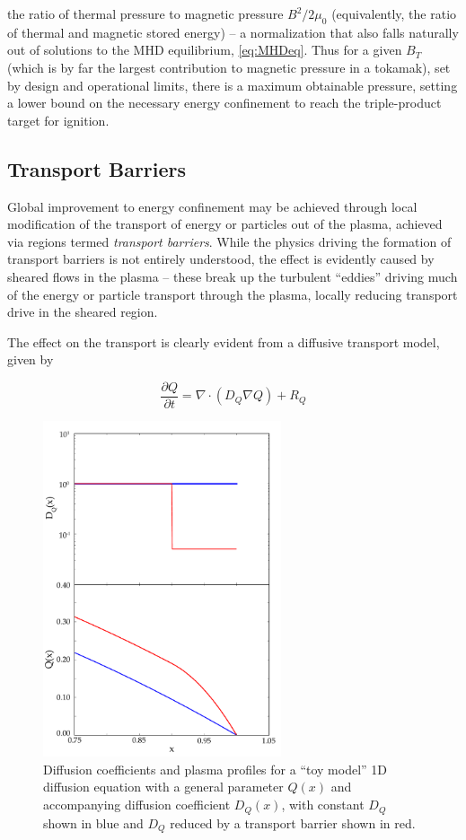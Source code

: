 \noindent the ratio of thermal pressure to magnetic pressure $B^2/2\mu_0$ (equivalently, the ratio of thermal and magnetic stored energy) -- a normalization that also falls naturally out of solutions to the MHD equilibrium, \cref{eq:MHDeq}.  Thus for a given $B_T$ (which is by far the largest contribution to magnetic pressure in a tokamak), set by design and operational limits, there is a maximum obtainable pressure, setting a lower bound on the necessary energy confinement to reach the triple-product target for ignition.

\subsection{Transport Barriers}\label{subsec:intro_barriers}

Global improvement to energy confinement may be achieved through local modification of the transport of energy or particles out of the plasma, achieved via regions termed \emph{transport barriers}.  While the physics driving the formation of transport barriers is not entirely understood, the effect is evidently caused by sheared flows in the plasma -- these break up the turbulent ``eddies'' driving much of the energy or particle transport through the plasma, locally reducing transport drive in the sheared region.  

The effect on the transport is clearly evident from a diffusive transport model, given by

\begin{equation}\label{eq:diffusion}
 \frac{\partial Q}{\partial t} = \nabla \cdot \left( D_Q \nabla Q \right) + R_Q
\end{equation}

\begin{figure}
 \includegraphics[width=70mm]{graphics/Introduction/transport.pdf}
 \caption[Diffusion coefficients and plasma profiles for a ``toy model'' diffusion equation.]{Diffusion coefficients and plasma profiles for a ``toy model'' 1D diffusion equation with a general parameter $Q(x)$ and accompanying diffusion coefficient $D_Q(x)$, with constant $D_Q$ shown in blue and $D_Q$ reduced by a transport barrier shown in red.}
 \label{fig:intro_transport}
\end{figure}

